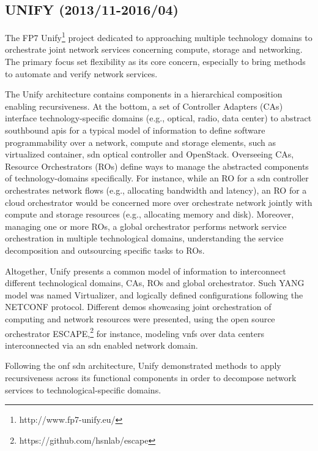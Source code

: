 
\subsection{UNIFY (2013/11-2016/04)}

The FP7 Unify\footnote{http://www.fp7-unify.eu/} project dedicated to approaching multiple technology domains to orchestrate joint network services concerning compute, storage and networking. The primary focus set flexibility as its core concern, especially to bring methods to automate and verify network services.

The Unify architecture contains components in a hierarchical composition enabling recursiveness.  At the bottom, a set of Controller Adapters (CAs) interface technology-specific domains (e.g., optical, radio, data center) to abstract southbound \glspl{api} for a typical model of information to define software programmability over a network, compute and storage elements, such as virtualized container, \gls{sdn} optical controller and OpenStack.   
Overseeing CAs, Resource Orchestrators (ROs) define ways to manage the abstracted components of technology-domains specifically. For instance, while an RO for a \gls{sdn} controller orchestrates network flows (e.g., allocating bandwidth and latency), an RO for a cloud orchestrator would be concerned more over orchestrate network jointly with compute and storage resources (e.g., allocating memory and disk). Moreover, managing one or more ROs, a global orchestrator performs network service orchestration in multiple technological domains, understanding the service decomposition and outsourcing specific tasks to ROs.

Altogether, Unify presents a common model of information to interconnect different technological domains, CAs, ROs and global orchestrator. Such YANG model was named Virtualizer, and logically defined configurations following the NETCONF protocol. 
Different demos showcasing joint orchestration of computing and network resources were presented, using the open source orchestrator ESCAPE,\footnote{https://github.com/hsnlab/escape} for instance, modeling \glspl{vnf} over data centers interconnected via an \gls{sdn} enabled network domain.

Following the \gls{onf} \gls{sdn} architecture, Unify demonstrated methods to apply recursiveness across its functional components in order to decompose network services to technological-specific domains. 


